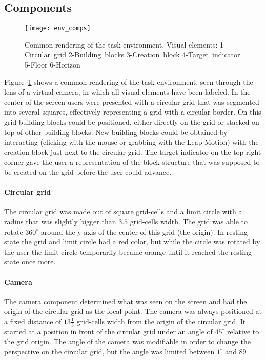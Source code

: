 \subsection{Components}\label{sec:components}

\begin{figure}[H]
\centering
\texttt{[image: env\_comps]}
\caption{\label{fig:environmentcomps} Common rendering of the task environment. Visual elements: 1-Circular~grid 2-Building~blocks 3-Creation~block 4-Target~indicator 5-Floor 
6-Horizon}
\end{figure}

\noindent Figure~\ref{fig:environmentcomps} shows a common rendering of the task environment, seen through the lens of a virtual camera, in which all visual elements have been 
labeled. In the center of the screen users were presented with a circular grid that was segmented into several squares, effectively representing a grid with a circular border. 
On this grid building blocks could be positioned, either directly on the grid or stacked on top of other building blocks. New building blocks could be obtained by interacting 
(clicking with the mouse or grabbing with the Leap Motion) with the creation block just next to the circular grid. The target indicator on the top right corner gave the user a 
representation of the block structure that was supposed to be created on the grid before the user could advance.

\paragraph{Circular grid}
The circular grid was made out of square grid-cells and a limit circle with a radius that was slightly bigger than $3.5$ grid-cells width. The grid was able to rotate 
$360^{\circ}$ around the y-axis of the center of this grid (the origin). In resting state the grid and limit circle had a red color, but while the circle was rotated by the 
user the limit circle temporarily became orange until it reached the resting state once more. 

\paragraph{Camera}
The camera component determined what was seen on the screen and had the origin of the circular grid as the focal point. The camera was always positioned at a fixed 
distance of $13 \frac{1}{3}$ grid-cells width from the origin of the circular grid. It started at a position in front of the circular grid under an angle of $45^{\circ}$ relative to the grid origin. The angle of the camera was modifiable in order to change the perspective on the circular grid, but the angle was limited between $1^{\circ}$ and $89^{\circ}$.

